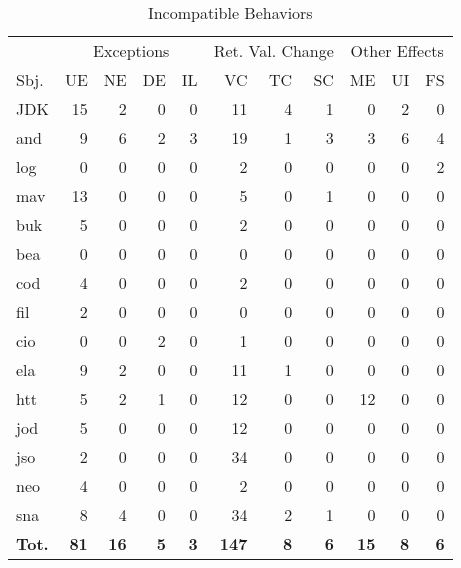 \begin{table}
 
	\caption{\label{table:Behave} Incompatible Behaviors}
	\begin{tabular}{|l|r|r|r|r|r|r|r|r|r|r|}
		\hline
		&  \multicolumn{4}{c|}{Exceptions}          &    \multicolumn{3}{c|}{Ret. Val. Change}  & \multicolumn{3}{c|}{Other Effects}\\
\cline{2-4} \cline{6-11}
Sbj. & UE & NE & DE & IL & VC & TC & SC & ME & UI & FS\\
\hline
JDK & 15 & 2 & 0 & 0 & 11 & 4 & 1 & 0 & 2 & 0\\
and & 9 & 6 & 2 & 3 & 19 & 1 & 3 & 3 & 6 & 4\\
log & 0 & 0 & 0 & 0 & 2 & 0 & 0 & 0 & 0 & 2\\
mav & 13 & 0 & 0 & 0 & 5 & 0 & 1 & 0 & 0 & 0\\
buk & 5 & 0 & 0 & 0 & 2 & 0 & 0 & 0 & 0 & 0\\
bea & 0 & 0 & 0 & 0 & 0 & 0 & 0 & 0 & 0 & 0\\
cod & 4 & 0 & 0 & 0 & 2 & 0 & 0 & 0 & 0 & 0\\
fil & 2 & 0 & 0 & 0 & 0 & 0 & 0 & 0 & 0 & 0\\
cio & 0 & 0 & 2 & 0 & 1 & 0 & 0 & 0 & 0 & 0\\
ela & 9 & 2 & 0 & 0 & 11 & 1 & 0 & 0 & 0 & 0\\
htt & 5 & 2 & 1 & 0 & 12 & 0 & 0 & 12 & 0 & 0\\
jod & 5 & 0 & 0 & 0 & 12 & 0 & 0 & 0 & 0 & 0\\
jso & 2 & 0 & 0 & 0 & 34 & 0 & 0 & 0 & 0 & 0\\
neo & 4 & 0 & 0 & 0 & 2 & 0 & 0 & 0 & 0 & 0\\
sna & 8 & 4 & 0 & 0 & 34 & 2 & 1 & 0 & 0 & 0\\
\hline
\textbf{Tot.} & \textbf{81} & \textbf{16} & \textbf{5} & \textbf{3} & \textbf{147} & \textbf{8} & \textbf{6} & \textbf{15} & \textbf{8} & \textbf{6}\\
\hline
	\end{tabular}	
	\vspace{1cm}
\end{table}